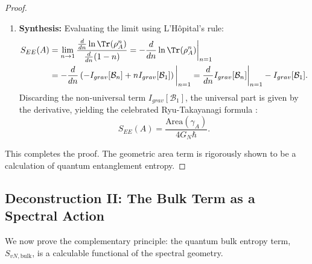 \documentclass[11pt, letterpaper]{report}
\theoremstyle{plain} %
\theoremstyle{definition} %
\theoremstyle{remark} %
\begin{document}
\begin{proof}
\begin{enumerate}
    \item \textbf{Synthesis:} Evaluating the limit using L'Hôpital's rule:
    \begin{align}
        S_{EE}(A) &= \lim_{n \to 1} \frac{\frac{d}{dn} \ln \Tr(\rho_A^n)}{\frac{d}{dn}(1-n)} = -\frac{d}{dn} \ln \Tr(\rho_A^n) \bigg|_{n=1} \nonumber \\
        &= -\frac{d}{dn} \left( -I_{grav}[\mathcal{B}_n] + n I_{grav}[\mathcal{B}_1] \right) \bigg|_{n=1} = \frac{d}{dn} I_{grav}[\mathcal{B}_n] \bigg|_{n=1} - I_{grav}[\mathcal{B}_1].
    \end{align}
    Discarding the non-universal term $I_{grav}[\mathcal{B}_1]$, the universal part is given by the derivative, yielding the celebrated Ryu-Takayanagi formula \cite{Ryu2006Holographic}:
    \begin{equation}
        S_{EE}(A) = \frac{\text{Area}(\gamma_A)}{4G_N\hbar}.
    \end{equation}
\end{enumerate}
This completes the proof. The geometric area term is rigorously shown to be a calculation of quantum entanglement entropy.
\end{proof}

\subsection{Deconstruction II: The Bulk Term as a Spectral Action}
\label{subsec:proof_spectral_from_statmech}

We now prove the complementary principle: the quantum bulk entropy term, $S_{vN, \text{bulk}}$, is a calculable functional of the spectral geometry.
\end{document}
